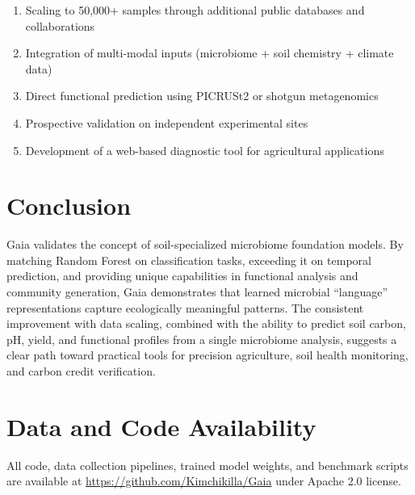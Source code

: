 \documentclass[11pt,a4paper]{article}
\begin{document}
\begin{enumerate}
\item Scaling to 50,000+ samples through additional public databases and collaborations
\item Integration of multi-modal inputs (microbiome + soil chemistry + climate data)
\item Direct functional prediction using PICRUSt2 or shotgun metagenomics
\item Prospective validation on independent experimental sites
\item Development of a web-based diagnostic tool for agricultural applications
\end{enumerate}

\section{Conclusion}

Gaia validates the concept of soil-specialized microbiome foundation models. By matching Random Forest on classification tasks, exceeding it on temporal prediction, and providing unique capabilities in functional analysis and community generation, Gaia demonstrates that learned microbial ``language'' representations capture ecologically meaningful patterns. The consistent improvement with data scaling, combined with the ability to predict soil carbon, pH, yield, and functional profiles from a single microbiome analysis, suggests a clear path toward practical tools for precision agriculture, soil health monitoring, and carbon credit verification.

\section*{Data and Code Availability}

All code, data collection pipelines, trained model weights, and benchmark scripts are available at \url{https://github.com/Kimchikilla/Gaia} under Apache 2.0 license.
\end{document}
